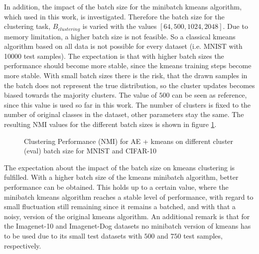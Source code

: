 \documentclass[12pt,DIV14,BCOR12mm,a4paper,footexclude,headinclude,halfparskip-,twoside,openright,cleardoubleempty,idxtotoc,bibtotoc,listtotoc]{scrreprt} %
\numberwithin{equation}{chapter}
\begin{document}
In addition, the impact of the batch size for the minibatch kmeans algorithm, which used in this work, is investigated. Therefore the batch size for the clustering task, $B_{clustering}$ is varied with the values $[64, 500, 1024, 2048]$. Due to memory limitation, a higher batch size is not feasible. So a classical kmeans algorithm based on all data is not possible for every dataset (i.e. MNIST with 10000 test samples). The expectation is that with higher batch sizes the performance should become more stable, since the kmeans training steps become more stable. With small batch sizes there is the risk, that the drawn samples in the batch does not represent the true distribution, so the cluster updates becomes biased towards the majority clusters. The value of $500$ can be seen as reference, since this value is used so far in this work. The number of clusters is fixed to the number of original classes in the dataset, other parameters stay the same. The resulting NMI values for the different batch sizes is shown in figure \ref{fig:ClusterPerformance_NMI_kmeans_eval_batch_size}.
	 \begin{figure}[htb!]
		\centering
		\qquad
		\caption{Clustering Performance (NMI) for AE + kmeans on different cluster (eval) batch size for MNIST and CIFAR-10}
		\label{fig:ClusterPerformance_NMI_kmeans_eval_batch_size}
	\end{figure}
The expectation about the impact of the batch size on kmeans clustering is fulfilled. With a higher batch size of the kmeans minibatch algorithm, better performance can be obtained. This holds up to a certain value, where the minibatch kmeans algorithm reaches a stable level of performance, with regard to small fluctuation still remaining since it remains a batched, and with that a noisy, version of the original kmeans algorithm. An additional remark is that for the Imagenet-10 and Imagenet-Dog datasets no minibatch version of kmeans has to be used due to its small test datasets with $500$ and $750$ test samples, respectively.
\end{document}
